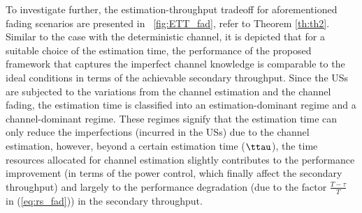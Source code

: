 {To investigate further, the estimation-throughput tradeoff for aforementioned fading scenarios are presented in \figurename~\ref{fig:ETT_fad}, refer to Theorem \ref{th:th2}. Similar to the case with the deterministic channel, it is depicted that for a suitable choice of the estimation time, the performance of the proposed framework that captures the imperfect channel knowledge is comparable to the ideal conditions in terms of the achievable secondary throughput. Since the USs are subjected to the variations from the channel estimation and the channel fading, the estimation time is classified into an estimation-dominant regime and a channel-dominant regime. These regimes signify that the estimation time can only reduce the imperfections (incurred in the USs) due to the channel estimation, however, beyond a certain estimation time ($\ttau$), the time resources allocated for channel estimation slightly contributes to the performance improvement (in terms of the power control, which finally affect the secondary throughput) and largely to the performance degradation (due to the factor $\frac{T - \tau}{T}$ in (\ref{eq:rs_fad})) in the secondary throughput. 

\captionsetup[subfigure]{position=top}
\begin{figure}[!ht]
\vspace{-4mm}
\centering
{}
\end{figure}}
